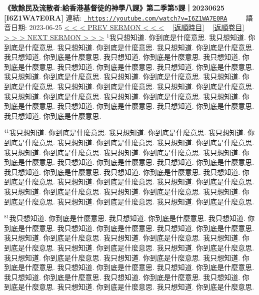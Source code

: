 \documentclass{book}
\begin{document}
\section{}
\label{sec:I6Z1WA7E0RA}
\textbf{《致餘民及流散者:給香港基督徒的神學八課》第二季第5課｜20230625 [I6Z1WA7E0RA]}
\newline
\newline
連結: \href{https://youtube.com/watch?v=I6Z1WA7E0RA}{\texttt{ https://youtube.com/watch?v=I6Z1WA7E0RA}} ~~~~ 語音日期: 2023-06-25 
\newline
\newline
\hyperref[sec:XixhhdfEXw8]{\small{< < < PREV SERMON < < <}}
~
\hyperref[sec:index_chronic]{\small{[返順時目]}}
~
\hyperref[sec:index_scriptual]{\small{[返順卷目]}}
~
\hyperref[sec:J_OpyaPLYIE]{\small{> > > NEXT SERMON > > >}}
\newline
\newline
$^{1}$我只想知道.
你到底是什麼意思.
我只想知道.
你到底是什麼意思.
我只想知道.
你到底是什麼意思.
我只想知道.
你到底是什麼意思.
我只想知道.
你到底是什麼意思.
我只想知道.
你到底是什麼意思.
我只想知道.
你到底是什麼意思.
我只想知道.
你到底是什麼意思.
我只想知道.
你到底是什麼意思.
我只想知道.
你到底是什麼意思.
我只想知道.
你到底是什麼意思.
我只想知道.
你到底是什麼意思.
我只想知道.
你到底是什麼意思.
我只想知道.
你到底是什麼意思.
我只想知道.
你到底是什麼意思.
我只想知道.
你到底是什麼意思.
我只想知道.
你到底是什麼意思.
我只想知道.
你到底是什麼意思.
我只想知道.
你到底是什麼意思.
我只想知道.
你到底是什麼意思.

$^{41}$我只想知道.
你到底是什麼意思.
我只想知道.
你到底是什麼意思.
我只想知道.
你到底是什麼意思.
我只想知道.
你到底是什麼意思.
我只想知道.
你到底是什麼意思.
我只想知道.
你到底是什麼意思.
我只想知道.
你到底是什麼意思.
我只想知道.
你到底是什麼意思.
我只想知道.
你到底是什麼意思.
我只想知道.
你到底是什麼意思.
我只想知道.
你到底是什麼意思.
我只想知道.
你到底是什麼意思.
我只想知道.
你到底是什麼意思.
我只想知道.
你到底是什麼意思.
我只想知道.
你到底是什麼意思.
我只想知道.
你到底是什麼意思.
我只想知道.
你到底是什麼意思.
我只想知道.
你到底是什麼意思.
我只想知道.
你到底是什麼意思.
我只想知道.
你到底是什麼意思.

$^{81}$我只想知道.
你到底是什麼意思.
我只想知道.
你到底是什麼意思.
我只想知道.
你到底是什麼意思.
我只想知道.
你到底是什麼意思.
我只想知道.
你到底是什麼意思.
我只想知道.
你到底是什麼意思.
我只想知道.
你到底是什麼意思.
我只想知道.
你到底是什麼意思.
我只想知道.
你到底是什麼意思.
我只想知道.
你到底是什麼意思.
我只想知道.
你到底是什麼意思.
我只想知道.
你到底是什麼意思.
我只想知道.
你到底是什麼意思.
我只想知道.
你到底是什麼意思.
我只想知道.
你到底是什麼意思.
我只想知道.
你到底是什麼意思.
我只想知道.
你到底是什麼意思.
我只想知道.
你到底是什麼意思.
我只想知道.
你到底是什麼意思.
我只想知道.
你到底是什麼意思.
\end{document}
